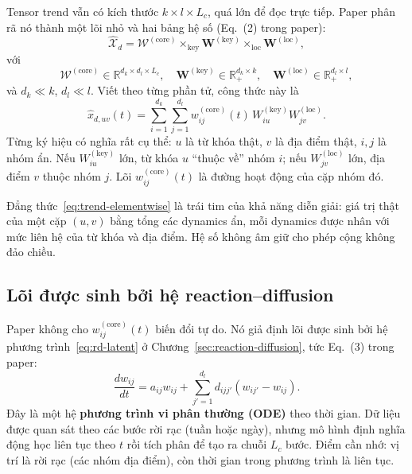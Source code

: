 Tensor trend vẫn có kích thước $k\times l\times L_c$, quá lớn để đọc trực tiếp. Paper phân rã nó
thành một lõi nhỏ và hai bảng hệ số (Eq.~(2) trong paper):
\begin{equation}
  \widehat{\mathcal{X}}_d
  =\mathcal{W}^{(\mathrm{core})}
   \times_{\mathrm{key}}\mathbf{W}^{(\mathrm{key})}
   \times_{\mathrm{loc}}\mathbf{W}^{(\mathrm{loc})},
  \label{eq:trend-factorization}
\end{equation}
với
\[
  \mathcal{W}^{(\mathrm{core})}\in\mathbb{R}^{d_k\times d_l\times L_c},
  \quad
  \mathbf{W}^{(\mathrm{key})}\in\mathbb{R}_{+}^{d_k\times k},
  \quad
  \mathbf{W}^{(\mathrm{loc})}\in\mathbb{R}_{+}^{d_l\times l},
\]
và $d_k\ll k$, $d_l\ll l$. Viết theo từng phần tử, công thức này là
\begin{equation}
  \widehat{x}_{d,uv}(t)
  =\sum_{i=1}^{d_k}\sum_{j=1}^{d_l}
    w^{(\mathrm{core})}_{ij}(t)\,
    W^{(\mathrm{key})}_{iu}W^{(\mathrm{loc})}_{jv}.
  \label{eq:trend-elementwise}
\end{equation}
Từng ký hiệu có nghĩa rất cụ thể: $u$ là từ khóa thật, $v$ là địa điểm thật, $i,j$ là nhóm ẩn.
Nếu $W^{(\mathrm{key})}_{iu}$ lớn, từ khóa $u$ ``thuộc về'' nhóm $i$; nếu
$W^{(\mathrm{loc})}_{jv}$ lớn, địa điểm $v$ thuộc nhóm $j$. Lõi $w^{(\mathrm{core})}_{ij}(t)$ là
đường hoạt động của cặp nhóm đó.

\begin{keypoint}
Đẳng thức~\eqref{eq:trend-elementwise} là trái tim của khả năng diễn giải: giá trị thật của một
cặp $(u,v)$ bằng tổng các dynamics ẩn, mỗi dynamics được nhân với mức liên hệ của từ khóa và địa
điểm. Hệ số không âm giữ cho phép cộng không đảo chiều.
\end{keypoint}

\subsection{Lõi được sinh bởi hệ reaction--diffusion}

Paper không cho $w^{(\mathrm{core})}_{ij}(t)$ biến đổi tự do. Nó giả định lõi được sinh bởi hệ
phương trình~\eqref{eq:rd-latent} ở Chương~\ref{sec:reaction-diffusion}, tức Eq.~(3) trong paper:
\begin{equation}
  \frac{dw_{ij}}{dt}
  =a_{ij}w_{ij}
   +\sum_{j'=1}^{d_l}d_{ijj'}(w_{ij'}-w_{ij}).
  \label{eq:core-ode}
\end{equation}
Đây là một hệ \textbf{phương trình vi phân thường (ODE)} theo thời gian. Dữ liệu được quan sát
theo các bước rời rạc (tuần hoặc ngày), nhưng mô hình định nghĩa động học liên tục theo $t$ rồi
tích phân để tạo ra chuỗi $L_c$ bước. Điểm cần nhớ: vị trí là rời rạc (các nhóm địa điểm), còn
thời gian trong phương trình là liên tục.

